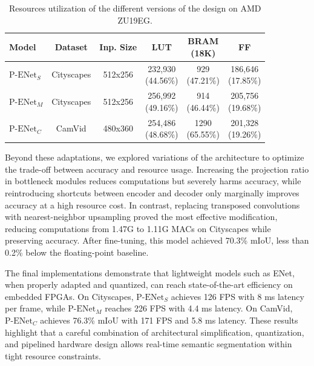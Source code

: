 \documentclass[11pt]{report}
\begin{document}
\begin{table}[]
  \centering
  \caption{Resources utilization of the different versions of the design on AMD ZU19EG.}
  \begin{tabular}{l|c|c|c|c|c}
    Model               & Dataset           & Inp. Size & LUT               & \makecell[c]{BRAM \\ (18K)} & FF\\\hline

    $\text{P-ENet}_{S}$ & Cityscapes        & 512x256   & \makecell{232,930                     \\(44.56\%)} & \makecell{929\\
    (47.21\%)}          & \makecell{186,646                                                     \\(17.85\%)}\\\hline
    $\text{P-ENet}_{M}$ & Cityscapes        & 512x256   & \makecell{256,992                     \\(49.16\%)} & \makecell{914\\(46.44\%)} & \makecell{205,756 \\(19.68\%)}\\ \hline\hline
    $\text{P-ENet}_{C}$ & CamVid            & 480x360   & \makecell{254,486                     \\(48.68\%)} & \makecell{1290\\(65.55\%)} & \makecell{201,328\\(19.26\%)}\\ \hline
  \end{tabular}
  \label{tab:impl}
\end{table}

Beyond these adaptations, we explored variations of the architecture to optimize the trade-off between accuracy and resource usage. Increasing the projection ratio in bottleneck modules reduces computations but severely harms accuracy, while reintroducing shortcuts between encoder and decoder only marginally improves accuracy at a high resource cost. In contrast, replacing transposed convolutions with nearest-neighbor upsampling proved the most effective modification, reducing computations from 1.47G to 1.11G MACs on Cityscapes while preserving accuracy. After fine-tuning, this model achieved 70.3\% mIoU, less than 0.2\% below the floating-point baseline.

The final implementations demonstrate that lightweight models such as ENet, when properly adapted and quantized, can reach state-of-the-art efficiency on embedded FPGAs. On Cityscapes, $\text{P-ENet}_S$ achieves 126 FPS with 8 ms latency per frame, while $\text{P-ENet}_M$ reaches 226 FPS with 4.4 ms latency. On CamVid, $\text{P-ENet}_C$ achieves 76.3\% mIoU with 171 FPS and 5.8 ms latency. These results highlight that a careful combination of architectural simplification, quantization, and pipelined hardware design allows real-time semantic segmentation within tight resource constraints.
\end{document}
